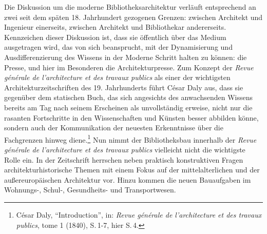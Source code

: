 Die Diskussion um die moderne Bibliotheksarchitektur verläuft
entsprechend an zwei seit dem späten 18. Jahrhundert gezogenen Grenzen:
zwischen Architekt und Ingenieur einerseits, zwischen Architekt und
Bibliothekar andererseits.\,Kennzeichen dieser Diskussion ist, dass sie
öffentlich über das Medium ausgetragen wird, das von sich beansprucht,
mit der Dynamisierung und Ausdifferenzierung des Wissens in der Moderne
Schritt halten zu können: die Presse, und hier im Besonderen die
Architekturpresse. Zum Konzept der \emph{Revue générale de
l'architecture et des travaux publics} als einer der wichtigsten
Architekturzeitschriften des 19. Jahrhunderts führt César Daly aus, dass
sie gegenüber dem statischen Buch, das sich angesichts des anwachsenden
Wissens bereits am Tag nach seinem Erscheinen als unvollständig erweise,
nicht nur die rasanten Fortschritte in den Wissenschaften und Künsten
besser abbilden könne, sondern auch der Kommunikation der neuesten
Erkenntnisse über die Fachgrenzen hinweg diene.\footnote{César Daly,
  \enquote{Introduction}, in: \emph{Revue générale de l'architecture et
  des travaux publics}, tome 1 (1840), S.\,1-7, hier S.\,4.} Nun nimmt der
Bibliotheksbau innerhalb der \emph{Revue générale de l'architecture et
des travaux publics} vielleicht nicht die wichtigste Rolle ein. In der
Zeitschrift herrschen neben praktisch konstruktiven Fragen
architekturhistorische Themen mit einem Fokus auf der mittelalterlichen
und der außereuropäischen Architektur vor. Hinzu kommen die neuen
Bauaufgaben im Wohnungs-, Schul-, Gesundheits- und Transportwesen.


